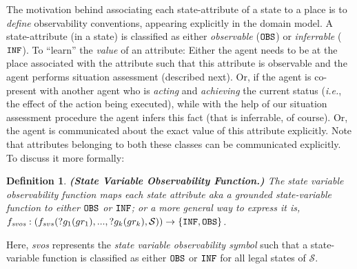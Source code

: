 \documentclass[letterpaper]{article} %
\newtheorem{definition}{Definition}
\begin{document}
The motivation behind associating each state-attribute of a state to a place is to \textit{define} observability conventions, appearing explicitly in the domain model. 
A state-attribute (in a state) is classified as either \textit{observable} ($\texttt{OBS}$) or \textit{inferrable} ($\texttt{INF}$). 
To ``learn'' the \textit{value} of an attribute: 
Either the agent needs to be at the place associated with the attribute such that this attribute is observable and the agent performs situation assessment (described next). 
Or, if the agent is co-present with another agent who is \textit{acting} and \textit{achieving} the current status (\textit{i.e.}, the effect of the action being executed), while with the help of our situation assessment procedure the agent infers this fact (that is inferrable, of course).
Or, the agent is communicated about the exact value of this attribute explicitly. Note that attributes belonging to both these classes can be communicated explicitly. 
% 
% 
To discuss it more formally:

\begin{definition}
\textbf{(State Variable Observability Function.)} 
The state variable observability function maps each state attribute {\em aka} a grounded \textit{state-variable function} 
to either $\texttt{OBS}$ or $\texttt{INF}$; or a more general way to express it is, $f_{\textit{svos}}: (f_{svs}(?g_1(gr_1),...,?g_k(gr_k),\mathcal{S}
)) \rightarrow 
    \{\texttt{INF}, \texttt{OBS}\}$.
\end{definition}
Here, \textit{svos} represents the \textit{state variable observability symbol} such that a state-variable function is classified as either $\texttt{OBS}$ or $\texttt{INF}$ for all legal states of $\mathcal{S}$.


\end{document}

